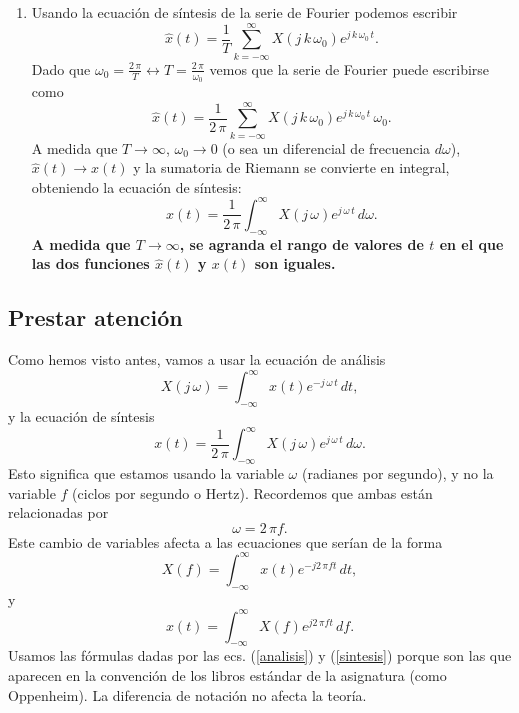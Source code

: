 \documentclass[11pt,a4paper,openany]{book}
\begin{document}
\begin{enumerate}
	\item Usando la ecuación de síntesis de la serie de Fourier podemos escribir 
	\begin{equation}
		\hat{x}(t) = \frac{1}{T} \sum_{k=-\infty}^{\infty} X(j \, k \, \omega_{0}) e^{j \, k \, \omega_{0} \, t}.
	\end{equation}
	Dado que $\omega_{0} = \frac{2 \, \pi}{T} \longleftrightarrow T = \frac{2 \, \pi}{\omega_{0}}$ vemos que la serie de Fourier puede escribirse como
	\begin{equation}
		\hat{x}(t) = \frac{1}{2 \, \pi} \sum_{k=-\infty}^{\infty} X(j \, k \, \omega_{0}) e^{j \, k \, \omega_{0} \, t} \, \omega_{0}.
	\end{equation}
	A medida que $T \rightarrow \infty$, $\omega_{0} \rightarrow 0$ (o sea un diferencial de frecuencia $d\omega$), $\hat{x}(t) \rightarrow x(t)$ y la sumatoria de Riemann se convierte en integral, obteniendo la ecuación de síntesis:
	\begin{equation}
		x(t) = \frac{1}{2 \, \pi} \int_{-\infty}^{\infty} X(j \, \omega) e^{j \, \omega \, t} \, d\omega .
	\end{equation}
	\textbf{A medida que $T \rightarrow \infty$, se agranda el rango de valores de $t$ en el que las dos funciones $\hat{x}(t)$ y $x(t)$ son iguales.}
\end{enumerate}

\subsection{Prestar atención}

Como hemos visto antes, vamos a usar la ecuación de análisis 
\begin{equation}
	X(j \, \omega) = \int_{-\infty}^{\infty} x(t) e^{-j \, \omega \, t} \, dt,  \label{analisis}
\end{equation}
y la ecuación de síntesis 
\begin{equation}
	x(t) = \frac{1}{2 \, \pi} \int_{-\infty}^{\infty} X(j \, \omega) e^{j \, \omega \, t} \, d\omega . \label{sintesis}
\end{equation}
Esto significa que estamos usando la variable $\omega$ (radianes por segundo), y no la variable $f$ (ciclos por segundo o Hertz). Recordemos que ambas están relacionadas por 
\begin{equation}
	\omega = 2 \, \pi f.
\end{equation}
Este cambio de variables afecta a las ecuaciones que serían de la forma 
\begin{equation}
	X(f) = \int_{-\infty}^{\infty} x(t) e^{-j 2 \, \pi f t} \, dt,
\end{equation}
y 
\begin{equation}
	x(t) = \int_{-\infty}^{\infty} X(f) e^{j 2 \, \pi f t} \, df.
\end{equation}
Usamos las fórmulas dadas por las ecs. (\ref{analisis}) y (\ref{sintesis}) porque son las que aparecen en la convención de los libros estándar de la asignatura (como Oppenheim). La diferencia de notación no afecta la teoría.
\end{document}
